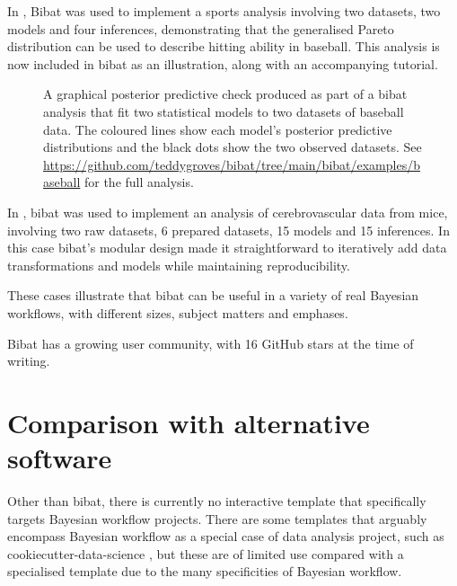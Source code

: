 \documentclass[sigconf, review]{acmart}
\begin{document}
In \citet{grovesBaseball2022}, Bibat was used to implement a sports
analysis involving two datasets, two models and four inferences,
demonstrating that the generalised Pareto distribution can be used to
describe hitting ability in baseball. This analysis is now included in
bibat as an illustration, along with an accompanying tutorial.

\begin{figure}


\caption{\label{fig-baseball}A graphical posterior predictive check
produced as part of a bibat analysis that fit two statistical models to
two datasets of baseball data. The coloured lines show each model's
posterior predictive distributions and the black dots show the two
observed datasets. See
\url{https://github.com/teddygroves/bibat/tree/main/bibat/examples/baseball}
for the full analysis.}

\end{figure}%

In \citet{grovesteddySphincter2024}, bibat was used to implement an
analysis of cerebrovascular data from mice, involving two raw datasets,
6 prepared datasets, 15 models and 15 inferences. In this case bibat's
modular design made it straightforward to iteratively add data
transformations and models while maintaining reproducibility.

These cases illustrate that bibat can be useful in a variety of real
Bayesian workflows, with different sizes, subject matters and emphases.

Bibat has a growing user community, with 16 GitHub stars at the time of
writing.

\section{Comparison with alternative
software}\label{comparison-with-alternative-software}

Other than bibat, there is currently no interactive template that
specifically targets Bayesian workflow projects. There are some
templates that arguably encompass Bayesian workflow as a special case of
data analysis project, such as cookiecutter-data-science
\citep{drivendataCookiecutterdatascience2022}, but these are of limited
use compared with a specialised template due to the many specificities
of Bayesian workflow.
\end{document}
